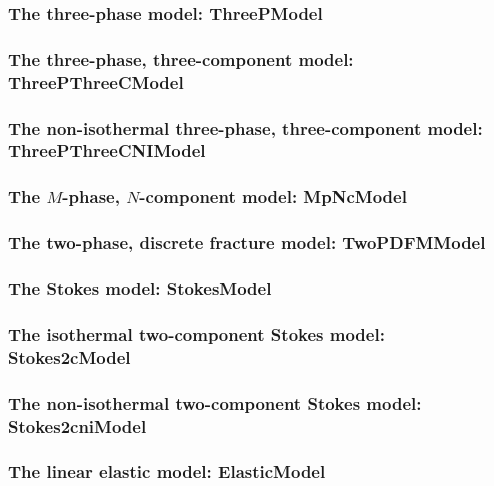 \subsubsection{The three-phase model: ThreePModel} 


\subsubsection{The three-phase, three-component model: ThreePThreeCModel}


\subsubsection{The non-isothermal three-phase, three-component model: ThreePThreeCNIModel} 


\subsubsection{The $M$-phase, $N$-component model: MpNcModel} 


\subsubsection{The two-phase, discrete fracture model: TwoPDFMModel} 


\subsubsection{The Stokes model: StokesModel} 


\subsubsection{The isothermal two-component Stokes model: Stokes2cModel} 


\subsubsection{The non-isothermal two-component Stokes model: Stokes2cniModel} 


\subsubsection{The linear elastic model: ElasticModel} 



